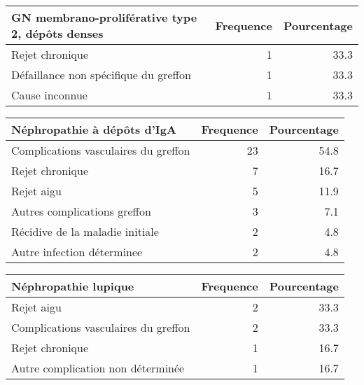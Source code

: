\documentclass[11pt,a4paper]{article}\usepackage[]{graphicx}\usepackage[]{color}
\begin{document}
\begin{table}[H]
\centering
\begin{tabular}{lrr}
  \hline
GN membrano-proliférative type 2, dépôts denses & Frequence & Pourcentage \\ 
  \hline
Rejet chronique & 1 & 33.3 \\ 
  Défaillance non spécifique du greffon & 1 & 33.3 \\ 
  Cause inconnue & 1 & 33.3 \\ 
   \hline
\end{tabular}
\end{table}
\begin{table}[H]
\centering
\begin{tabular}{lrr}
  \hline
Néphropathie à dépôts d'IgA & Frequence & Pourcentage \\ 
  \hline
Complications vasculaires du greffon & 23 & 54.8 \\ 
  Rejet chronique & 7 & 16.7 \\ 
  Rejet aigu & 5 & 11.9 \\ 
  Autres complications greffon & 3 & 7.1 \\ 
  Récidive de la maladie initiale & 2 & 4.8 \\ 
  Autre infection déterminee & 2 & 4.8 \\ 
   \hline
\end{tabular}
\end{table}
\begin{table}[H]
\centering
\begin{tabular}{lrr}
  \hline
Néphropathie lupique & Frequence & Pourcentage \\ 
  \hline
Rejet aigu & 2 & 33.3 \\ 
  Complications vasculaires du greffon & 2 & 33.3 \\ 
  Rejet chronique & 1 & 16.7 \\ 
  Autre complication non déterminée & 1 & 16.7 \\ 
   \hline
\end{tabular}
\end{table}
\end{document}
